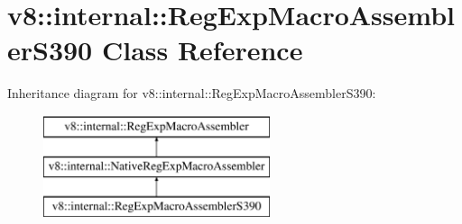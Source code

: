 \hypertarget{classv8_1_1internal_1_1_reg_exp_macro_assembler_s390}{}\section{v8\+:\+:internal\+:\+:Reg\+Exp\+Macro\+Assembler\+S390 Class Reference}
\label{classv8_1_1internal_1_1_reg_exp_macro_assembler_s390}
Inheritance diagram for v8\+:\+:internal\+:\+:Reg\+Exp\+Macro\+Assembler\+S390\+:\begin{figure}[H]
\begin{center}
\leavevmode
\includegraphics[height=3.000000cm]{classv8_1_1internal_1_1_reg_exp_macro_assembler_s390}
\end{center}
\end{figure}
